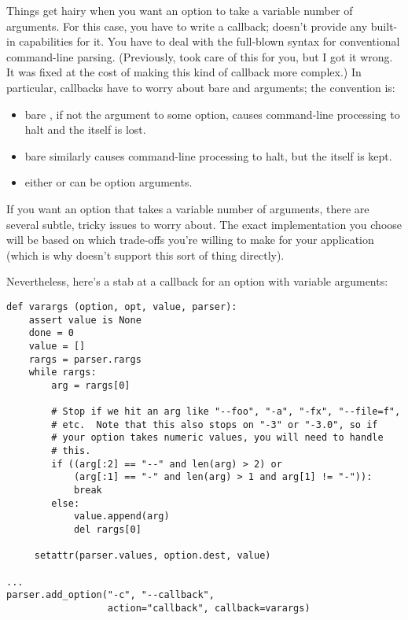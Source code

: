 
Things get hairy when you want an option to take a variable number of
arguments.  For this case, you have to write a callback;
 doesn't provide any built-in capabilities for it.
You have to deal with the full-blown syntax for conventional \UNIX{}
command-line parsing.  (Previously,  took care of
this for you, but I got it wrong.  It was fixed at the cost of making
this kind of callback more complex.)  In particular, callbacks have to
worry about bare \longprogramopt{} and \programopt{-} arguments; the
convention is:

\begin{itemize}
\item bare \longprogramopt{}, if not the argument to some option,
causes command-line processing to halt and the \longprogramopt{}
itself is lost.

\item bare \programopt{-} similarly causes command-line processing to
halt, but the \programopt{-} itself is kept.

\item either \longprogramopt{} or \programopt{-} can be option
arguments.
\end{itemize}

If you want an option that takes a variable number of arguments, there
are several subtle, tricky issues to worry about.  The exact
implementation you choose will be based on which trade-offs you're
willing to make for your application (which is why 
doesn't support this sort of thing directly).

Nevertheless, here's a stab at a callback for an option with variable
arguments:

\begin{verbatim}
def varargs (option, opt, value, parser):
    assert value is None
    done = 0
    value = []
    rargs = parser.rargs
    while rargs:
        arg = rargs[0]

        # Stop if we hit an arg like "--foo", "-a", "-fx", "--file=f",
        # etc.  Note that this also stops on "-3" or "-3.0", so if
        # your option takes numeric values, you will need to handle
        # this.
        if ((arg[:2] == "--" and len(arg) > 2) or
            (arg[:1] == "-" and len(arg) > 1 and arg[1] != "-")):
            break
        else:
            value.append(arg)
            del rargs[0]

     setattr(parser.values, option.dest, value)

...
parser.add_option("-c", "--callback",
                  action="callback", callback=varargs)
\end{verbatim}

